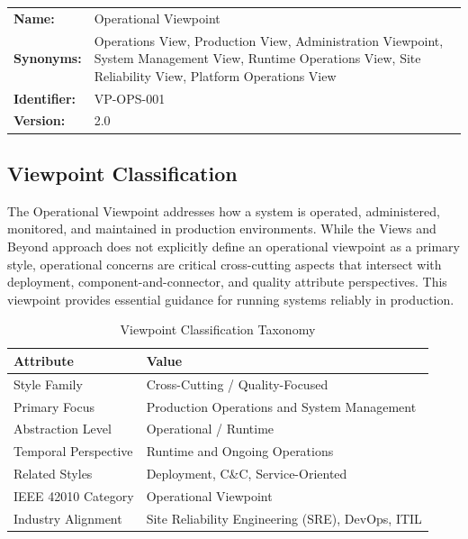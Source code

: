 \documentclass[11pt,letterpaper]{article}
\begin{document}
\begin{definitionbox}
\begin{tabular}{@{}L{3.5cm}L{10cm}@{}}
\textbf{Name:} & Operational Viewpoint \\[0.5em]
\textbf{Synonyms:} & Operations View, Production View, Administration Viewpoint, System Management View, Runtime Operations View, Site Reliability View, Platform Operations View \\[0.5em]
\textbf{Identifier:} & VP-OPS-001 \\[0.5em]
\textbf{Version:} & 2.0 \\
\end{tabular}
\end{definitionbox}

\subsection{Viewpoint Classification}

The Operational Viewpoint addresses how a system is operated, administered, monitored, and maintained in production environments. While the Views and Beyond approach does not explicitly define an operational viewpoint as a primary style, operational concerns are critical cross-cutting aspects that intersect with deployment, component-and-connector, and quality attribute perspectives. This viewpoint provides essential guidance for running systems reliably in production.

\begin{table}[H]
\centering
\caption{Viewpoint Classification Taxonomy}
\begin{tabular}{@{}L{4cm}L{10cm}@{}}
\toprule
\textbf{Attribute} & \textbf{Value} \\
\midrule
Style Family & Cross-Cutting / Quality-Focused \\
Primary Focus & Production Operations and System Management \\
Abstraction Level & Operational / Runtime \\
Temporal Perspective & Runtime and Ongoing Operations \\
Related Styles & Deployment, C\&C, Service-Oriented \\
IEEE 42010 Category & Operational Viewpoint \\
Industry Alignment & Site Reliability Engineering (SRE), DevOps, ITIL \\
\bottomrule
\end{tabular}
\end{table}
\end{document}
